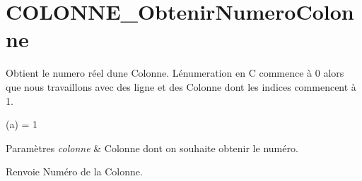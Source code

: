 \hypertarget{COLONNE_ObtenirNumeroColonne-example}{}\section{C\+O\+L\+O\+N\+N\+E\+\_\+\+Obtenir\+Numero\+Colonne}
Obtient le numero réel d\textquotesingle{}une Colonne. L\textquotesingle{}énumeration en C commence à 0 alors que nous travaillons avec des ligne et des Colonne dont les indices commencent à 1.

(a) = 1


\begin{DoxyParams}{Paramètres}
{\em colonne} & Colonne dont on souhaite obtenir le numéro.\\
\hline
\end{DoxyParams}
\begin{DoxyReturn}{Renvoie}
Numéro de la Colonne.
\end{DoxyReturn}

\begin{DoxyCodeInclude}
\end{DoxyCodeInclude}
 